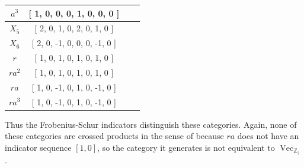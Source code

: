 \documentclass[a4paper, 10pt]{book}
\theoremstyle{definition}
\numberwithin{equation}{chapter}
\newcommand\Vect{\operatorname{Vec}}
\newcommand\ZZ{\mathbb Z}
\begin{document}
\begin{enumerate}
\begin{center}
\begin{tabular}{ | c |c | c | r |}
 $a^3$ &[ 1, 0, 0, 0, 1, 0, 0, 0 ]\\
  \hline
$X_5$&  [ 2, 0, 1, 0, 2, 0, 1, 0 ]\\
  \hline
$ X_6 $&  [ 2, 0, -1, 0, 0, 0, -1, 0 ]\\
  \hline
 $r$& [ 1, 0, 1, 0, 1, 0, 1, 0 ]\\
  \hline
 $ra^2$ & [ 1, 0, 1, 0, 1, 0, 1, 0 ]\\
  \hline
  
 $ra$&  [ 1, 0, -1, 0, 1, 0, -1, 0 ]\\
  \hline

 $ra^3$& [ 1, 0, -1, 0, 1, 0, -1, 0 ]\\
  \hline

   
  \end{tabular}
\end{center}
Thus the Frobenius-Schur indicators distinguish these categories. Again, none of these categories are crossed products in the sense of \cite[Definition 4.15.5]{EGNO} because $ra$ does not have an indicator sequence $[1, 0]$, so the category it generates is not equivalent to $\Vect_{\ZZ_2}$.


\end{enumerate}
\end{document}

